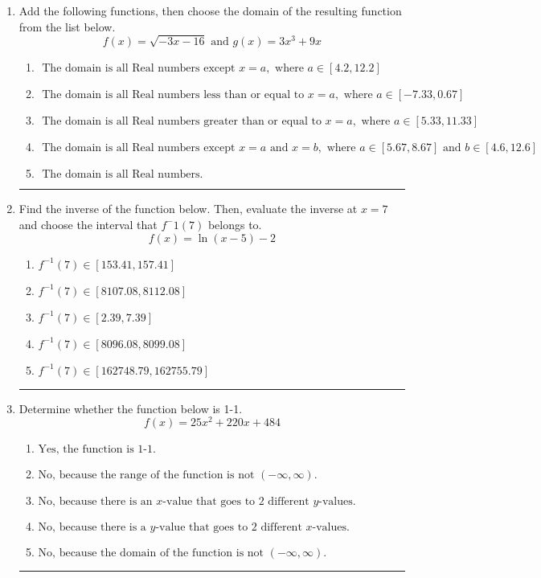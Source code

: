 \documentclass[14pt]{extbook}
\newcommand{\litem}[1]{\item#1\hspace*{-1cm}\rule{\textwidth}{0.4pt}}
\begin{document}
\begin{enumerate}
\litem{
Add the following functions, then choose the domain of the resulting function from the list below.\[ f(x) = \sqrt{-3x-16}  \text{ and } g(x) = 3x^{3} +9 x \]\begin{enumerate}[label=\Alph*.]
\item \( \text{ The domain is all Real numbers except } x = a, \text{ where } a \in [4.2, 12.2] \)
\item \( \text{ The domain is all Real numbers less than or equal to } x = a, \text{ where } a \in [-7.33, 0.67] \)
\item \( \text{ The domain is all Real numbers greater than or equal to } x = a, \text{ where } a \in [5.33, 11.33] \)
\item \( \text{ The domain is all Real numbers except } x = a \text{ and } x = b, \text{ where } a \in [5.67, 8.67] \text{ and } b \in [4.6, 12.6] \)
\item \( \text{ The domain is all Real numbers. } \)

\end{enumerate} }
\litem{
Find the inverse of the function below. Then, evaluate the inverse at $x = 7$ and choose the interval that $f^-1(7)$ belongs to.\[ f(x) = \ln{(x-5)}-2 \]\begin{enumerate}[label=\Alph*.]
\item \( f^{-1}(7) \in [153.41, 157.41] \)
\item \( f^{-1}(7) \in [8107.08, 8112.08] \)
\item \( f^{-1}(7) \in [2.39, 7.39] \)
\item \( f^{-1}(7) \in [8096.08, 8099.08] \)
\item \( f^{-1}(7) \in [162748.79, 162755.79] \)

\end{enumerate} }
\litem{
Determine whether the function below is 1-1.\[ f(x) = 25 x^2 + 220 x + 484 \]\begin{enumerate}[label=\Alph*.]
\item \( \text{Yes, the function is 1-1.} \)
\item \( \text{No, because the range of the function is not $(-\infty, \infty)$.} \)
\item \( \text{No, because there is an $x$-value that goes to 2 different $y$-values.} \)
\item \( \text{No, because there is a $y$-value that goes to 2 different $x$-values.} \)
\item \( \text{No, because the domain of the function is not $(-\infty, \infty)$.} \)


\end{enumerate}}
\end{enumerate}
\end{document}
